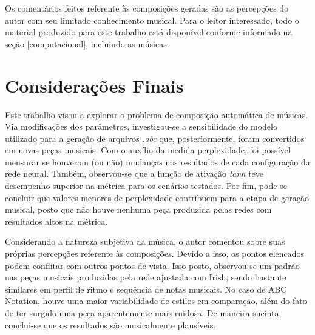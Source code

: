 \documentclass{automatextcc}
\newcommand{\pumi}[1]{\textcolor{red}{#1}}
\begin{document}
Os comentários feitos referente às composições geradas são as percepções do autor com seu limitado conhecimento musical. Para o leitor interessado, todo o material produzido para este trabalho está disponível conforme informado na seção \ref{computacional}, incluindo as músicas.




\chapter{Considerações Finais}



Este trabalho visou a explorar o problema de composição automática de músicas. Via modificações dos parâmetros, investigou-se a sensibilidade do modelo utilizado para a geração de arquivos \textit{.abc} que, posteriormente, foram convertidos em novas peças musicais. Com o auxílio da medida perplexidade, foi possível mensurar se houveram (ou não) mudanças nos resultados de cada configuração da rede neural. Também, observou-se que a função de ativação \textit{tanh} teve desempenho superior na métrica para os cenários testados. Por fim, pode-se concluir que valores menores de perplexidade contribuem para a etapa de geração musical, posto que não houve nenhuma peça produzida pelas redes com resultados altos na métrica. 

Considerando a natureza subjetiva da música, o autor comentou sobre suas próprias percepções referente às composições. Devido a isso, os pontos elencados podem conflitar com outros pontos de vista. Isso posto, observou-se um padrão nas peças musicais produzidas pela rede ajustada com Irish, sendo bastante similares em perfil de ritmo e sequência de notas musicais. No caso de ABC Notation, houve uma maior variabilidade de estilos em comparação, além do fato de ter surgido uma peça aparentemente mais ruidosa. De maneira sucinta, conclui-se que os resultados são musicalmente plausíveis.
\end{document}
